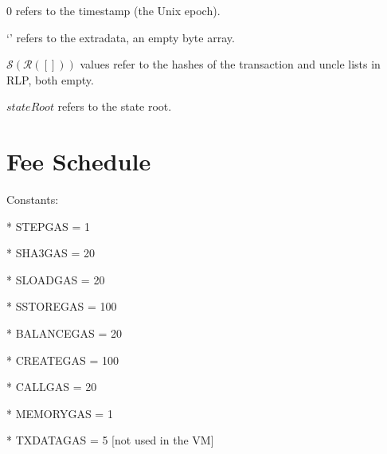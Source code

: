 \documentclass[9pt,oneside]{amsart}
\begin{document}
\begin{multicols}{2}
0 refers to the timestamp (the Unix epoch).

`' refers to the extradata, an empty byte array.

$\mathcal{S}(\mathcal{R}([]))$ values refer to the hashes of the transaction and uncle lists in RLP, both empty.

$stateRoot$ refers to the state root.

\section{Fee Schedule}\label{app:fees}

Constants:

* STEPGAS = 1

* SHA3GAS = 20

* SLOADGAS = 20

* SSTOREGAS = 100

* BALANCEGAS = 20

* CREATEGAS = 100

* CALLGAS = 20

* MEMORYGAS = 1

* TXDATAGAS = 5 [not used in the VM]

\end{multicols}
\end{document}
